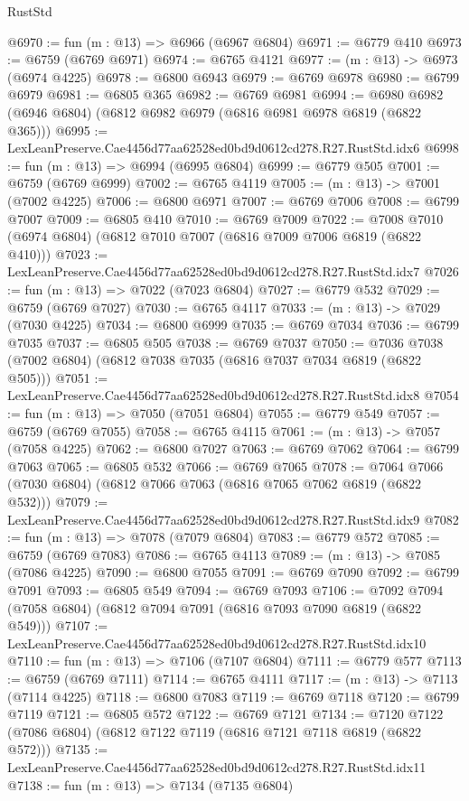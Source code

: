 \begin{lexlean}{RustStd}
\begin{coremodule}
@6970 := fun (m : @13) => @6966 (@6967 @6804)
@6971 := @6779 @410
@6973 := @6759 (@6769 @6971)
@6974 := @6765 @4121
@6977 := (m : @13) -> @6973 (@6974 @4225)
@6978 := @6800 @6943
@6979 := @6769 @6978
@6980 := @6799 @6979
@6981 := @6805 @365
@6982 := @6769 @6981
@6994 := @6980 @6982 (@6946 @6804) (@6812 @6982 @6979 (@6816 @6981 @6978 @6819 (@6822 @365)))
@6995 := LexLeanPreserve.Cae4456d77aa62528ed0bd9d0612cd278.R27.RustStd.idx6
@6998 := fun (m : @13) => @6994 (@6995 @6804)
@6999 := @6779 @505
@7001 := @6759 (@6769 @6999)
@7002 := @6765 @4119
@7005 := (m : @13) -> @7001 (@7002 @4225)
@7006 := @6800 @6971
@7007 := @6769 @7006
@7008 := @6799 @7007
@7009 := @6805 @410
@7010 := @6769 @7009
@7022 := @7008 @7010 (@6974 @6804) (@6812 @7010 @7007 (@6816 @7009 @7006 @6819 (@6822 @410)))
@7023 := LexLeanPreserve.Cae4456d77aa62528ed0bd9d0612cd278.R27.RustStd.idx7
@7026 := fun (m : @13) => @7022 (@7023 @6804)
@7027 := @6779 @532
@7029 := @6759 (@6769 @7027)
@7030 := @6765 @4117
@7033 := (m : @13) -> @7029 (@7030 @4225)
@7034 := @6800 @6999
@7035 := @6769 @7034
@7036 := @6799 @7035
@7037 := @6805 @505
@7038 := @6769 @7037
@7050 := @7036 @7038 (@7002 @6804) (@6812 @7038 @7035 (@6816 @7037 @7034 @6819 (@6822 @505)))
@7051 := LexLeanPreserve.Cae4456d77aa62528ed0bd9d0612cd278.R27.RustStd.idx8
@7054 := fun (m : @13) => @7050 (@7051 @6804)
@7055 := @6779 @549
@7057 := @6759 (@6769 @7055)
@7058 := @6765 @4115
@7061 := (m : @13) -> @7057 (@7058 @4225)
@7062 := @6800 @7027
@7063 := @6769 @7062
@7064 := @6799 @7063
@7065 := @6805 @532
@7066 := @6769 @7065
@7078 := @7064 @7066 (@7030 @6804) (@6812 @7066 @7063 (@6816 @7065 @7062 @6819 (@6822 @532)))
@7079 := LexLeanPreserve.Cae4456d77aa62528ed0bd9d0612cd278.R27.RustStd.idx9
@7082 := fun (m : @13) => @7078 (@7079 @6804)
@7083 := @6779 @572
@7085 := @6759 (@6769 @7083)
@7086 := @6765 @4113
@7089 := (m : @13) -> @7085 (@7086 @4225)
@7090 := @6800 @7055
@7091 := @6769 @7090
@7092 := @6799 @7091
@7093 := @6805 @549
@7094 := @6769 @7093
@7106 := @7092 @7094 (@7058 @6804) (@6812 @7094 @7091 (@6816 @7093 @7090 @6819 (@6822 @549)))
@7107 := LexLeanPreserve.Cae4456d77aa62528ed0bd9d0612cd278.R27.RustStd.idx10
@7110 := fun (m : @13) => @7106 (@7107 @6804)
@7111 := @6779 @577
@7113 := @6759 (@6769 @7111)
@7114 := @6765 @4111
@7117 := (m : @13) -> @7113 (@7114 @4225)
@7118 := @6800 @7083
@7119 := @6769 @7118
@7120 := @6799 @7119
@7121 := @6805 @572
@7122 := @6769 @7121
@7134 := @7120 @7122 (@7086 @6804) (@6812 @7122 @7119 (@6816 @7121 @7118 @6819 (@6822 @572)))
@7135 := LexLeanPreserve.Cae4456d77aa62528ed0bd9d0612cd278.R27.RustStd.idx11
@7138 := fun (m : @13) => @7134 (@7135 @6804)

\end{coremodule}
\end{lexlean}
